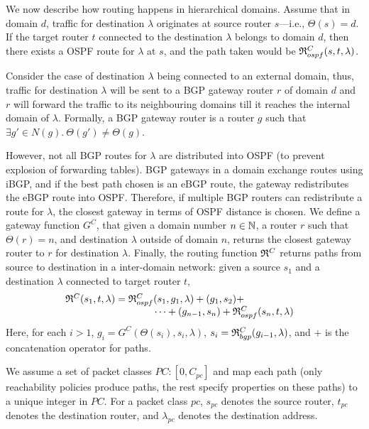  We now describe how routing
happens in hierarchical domains.  Assume that in domain $d$, traffic 
for destination $\lambda$ originates at source
router $s$---i.e., $\Theta(s) = d$. 
If the target router $t$ connected to the
destination $\lambda$ belongs to domain $d$, then there exists a OSPF route for
$\lambda$ at $s$, and the path taken would be
$\mathfrak{R}_{ospf}^C(s,t,\lambda)$.

Consider the case of destination $\lambda$ being connected 
to an external domain, thus, traffic for destination $\lambda$
will be sent to a BGP gateway router $r$ of domain $d$ and $r$ 
will forward  the traffic to its neighbouring domains till
it reaches the internal domain of $\lambda$. Formally, a BGP gateway
router is a router $g$ such that $\exists g' \in N(g). 
~\Theta(g') \not= \Theta(g)$. 

However, not all BGP routes for $\lambda$
are distributed 
into OSPF (to prevent explosion of forwarding tables). 
BGP gateways in a domain exchange routes using iBGP,
and if the best path chosen is an eBGP route, 
the gateway redistributes the eBGP route into OSPF. 
Therefore, if multiple BGP routers
can redistribute a route for $\lambda$,  
the closest gateway in terms of OSPF distance
is chosen. We define a gateway function $G^C$,
that given a domain number $n\in \mathbb{N}$,
a router $r$ such that $\Theta(r)=n$,
and destination $\lambda$ outside of domain $n$, 
returns the closest
gateway router to $r$ for destination $\lambda$. 
Finally, the routing function 
$\mathfrak{R}^C$
returns paths from source to destination in a inter-domain network:
given a source $s_1$ and a destination $\lambda$ connected to target router $t$, 
\[
\begin{array}{c}
	\mathfrak{R}^C(s_1, t, \lambda) = 
	\mathfrak{R}_{ospf}^C(s_1,g_1, \lambda) + 
	 (g_1, s_2 )+\qquad\qquad\qquad  \\
	\qquad\qquad\qquad\qquad \cdots  + (g_{n-1}, s_n) +\mathfrak{R}_{ospf}^C(s_n,t,\lambda)
\end{array}
\]
Here, for each $i>1$, $g_i=G^C(\Theta(s_i),s_i,\lambda)$, 
$s_i=\mathfrak{R}_{bgp}^C(g_{i-1}, \lambda)$,
and  $+$ is the concatenation operator for paths. 

We assume a set of packet classes $PC : [0,C_{pc}]$ 
and map each path (only reachability policies produce paths,
the rest specify properties on these paths)
to a unique integer in $PC$.
For a packet class $pc$, $s_{pc}$ denotes the source router,
$t_{pc}$ denotes the destination router, and $\lambda_{pc}$
denotes the destination   address. 


